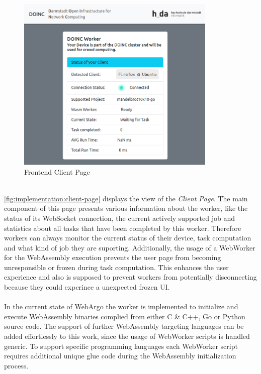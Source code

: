 \begin{figure}[htbp]
    \centering
    \includegraphics[width=0.85\textwidth]{gfx/figures/client-page.png}
    \caption{Frontend Client Page}
    \label{fig:implementation:client-page}
\end{figure}
~\\
\autoref{fig:implementation:client-page} displays the view of the \emph{Client Page}. The main component of this page presents various information about the worker, like the status of its WebSocket connection, the current actively supported job and statistics about all tasks that have been completed by this worker. Therefore workers can always monitor the current status of their device, task computation and what kind of job they are suporting. Additionally, the usage of a WebWorker for the WebAssembly execution prevents the user page from becoming unresponsible or frozen during task computation. This enhances the user experience and also is supposed to prevent workers from potentially disconnecting because they could experince a unexpected frozen \ac{UI}.
\\~\\
In the current state of WebArgo the worker is implemented to initialize and execute WebAssembly binaries complied from either C \& C++, Go or Python source code. The support of further WebAssembly targeting languages can be added effortlessly to this work, since the usage of WebWorker scripts is handled generic. To support specific programming languages each WebWorker script requires additional unique glue code during the WebAssembly initialization process.

